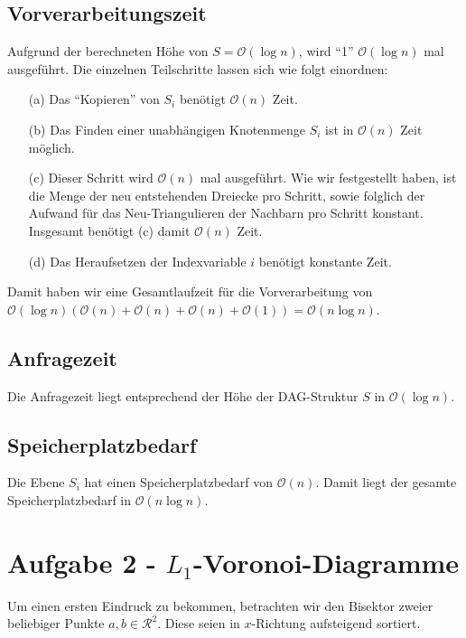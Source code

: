 \documentclass[a4paper]{article}
\begin{document}
\subsection*{Vorverarbeitungszeit}
Aufgrund der berechneten Höhe von $S = \mathcal{O}(\log n)$, wird "`1"'  $\mathcal{O}(\log n)$ mal ausgeführt. Die einzelnen Teilschritte lassen sich wie folgt einordnen:

\begin{itemize}
\item[(a)] Das "`Kopieren"' von $S_i$ benötigt $\mathcal{O}(n)$ Zeit.
\item[(b)] Das Finden einer unabhängigen Knotenmenge $S_i$ ist in $\mathcal{O}(n)$ Zeit möglich.
\item[(c)] Dieser Schritt wird $\mathcal{O}(n)$ mal ausgeführt. Wie wir festgestellt haben, 
           ist die Menge der neu entstehenden Dreiecke pro Schritt,
           sowie folglich der Aufwand für das Neu-Triangulieren der Nachbarn pro Schritt konstant.
           Insgesamt benötigt (c) damit $\mathcal{O}(n)$ Zeit.
\item[(d)] Das Heraufsetzen der Indexvariable $i$ benötigt konstante Zeit.
\end{itemize}

Damit haben wir eine Gesamtlaufzeit für die Vorverarbeitung von $\mathcal{O}(\log n) (\mathcal{O}(n) +
\mathcal{O}(n) + \mathcal{O}(n) + \mathcal{O}(1)) = \mathcal{O}(n \log n)$.

\subsection*{Anfragezeit}
Die Anfragezeit liegt entsprechend der Höhe der DAG-Struktur $S$ in $\mathcal{O}(\log n)$.

\subsection*{Speicherplatzbedarf}
Die Ebene $S_i$ hat einen Speicherplatzbedarf von $\mathcal{O}(n)$.
Damit liegt der gesamte Speicherplatzbedarf in $\mathcal{O}(n \log n)$.

\section*{Aufgabe 2 - $L_1$-Voronoi-Diagramme}

Um einen ersten Eindruck zu bekommen, betrachten wir den Bisektor zweier beliebiger Punkte $a, b \in \mathcal{R}^2$. Diese seien in $x$-Richtung aufsteigend sortiert. 
\end{document}
